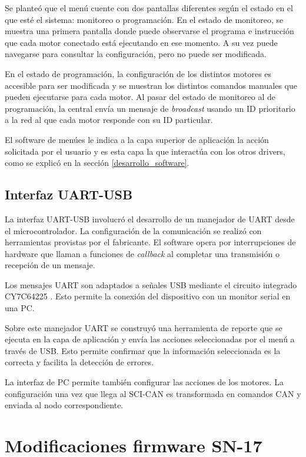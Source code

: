Se planteó que el menú cuente con dos pantallas diferentes según el estado en el que esté el sistema: monitoreo o programación. En el estado de monitoreo, se muestra una primera pantalla donde puede observarse el programa e instrucción que cada motor conectado está ejecutando en ese momento. A su vez puede navegarse para consultar la configuración, pero no puede ser modificada.

En el estado de programación, la configuración de los distintos motores es accesible para ser modificada y se muestran los distintos comandos manuales que pueden ejecutarse para cada motor. Al pasar del estado de monitoreo al de programación, la central envía un mensaje de \textit{broadcast} usando un ID prioritario a la red al que cada motor responde con su ID particular.

El software de menúes le indica a la capa superior de aplicación la acción solicitada por el usuario y es esta capa la que interactúa con los otros drivers, como se explicó en la sección \ref{desarrollo_software}.

\subsection{Interfaz UART-USB}

La interfaz UART-USB involucró el desarrollo de un manejador de UART desde el microcontrolador. La configuración de la comunicación se realizó con herramientas provistas por el fabricante. El software opera por interrupciones de hardware que llaman a funciones de \textit{callback} al completar una transmisión o recepción de un mensaje.

Los mensajes UART son adaptados a señales USB mediante el circuito integrado CY7C64225 \citep{web_interfaz_USB_UART}. Esto permite la conexión del dispositivo con un monitor serial en una PC.

Sobre este manejador UART se construyó una herramienta de reporte que se ejecuta en la capa de aplicación y envía las acciones seleccionadas por el menú a través de USB. Esto permite confirmar que la información seleccionada es la correcta y facilita la detección de errores.

La interfaz de PC permite también configurar las acciones de los motores. La configuración una vez que llega al SCI-CAN es transformada en comandos CAN y enviada al nodo correspondiente.

\section{Modificaciones firmware SN-17}

